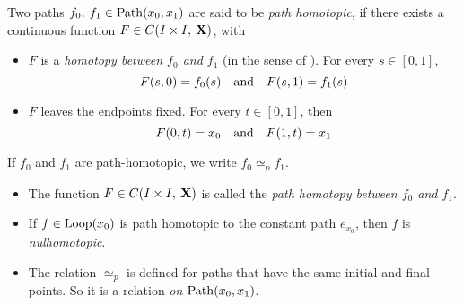 \documentclass[../main-manifolds.tex]{subfiles}
\providecommand{\phtp}{\simeq_p} %
\begin{document}
\begin{definition}\label{munkres:path-homotopy}
    Two paths $f_0,\: f_1\in\Path[x_0,x_1]$ are said to be \emph{path homotopic}, if there exists a continuous function $F\in C(I\times I,\: {\mathbf{X}})$, with
    \begin{itemize}
        \item $F$ is a \emph{homotopy between $f_0$ and $f_1$} (in the sense of ). For every $s\in [0,1]$,
        \begin{equation}\label{munkres:path-homotopy-deformation}
            F(s,0)=f_0(s)\qqtext{and}F(s,1)=f_1(s)
        \end{equation}
        \item $F$ leaves the endpoints fixed. For every $t\in[0,1]$, then
        \begin{equation}\label{munkres:path-homotopy-endpoints}
            F(0,t)=x_0\qqtext{and}F(1,t)=x_1
        \end{equation}
    \end{itemize}
    If $f_0$ and $f_1$ are path-homotopic, we write $f_0\phtp f_1$.\\

    \begin{itemize}
        \item The function $F\in C(I\times I,\: {\mathbf{X}})$ is called the \emph{path homotopy between $f_0$ and $f_1$}. 
        \item If $f\in\Loop[x_0]$ is path homotopic to the constant path $e_{x_0}$, then $f$ is \emph{nulhomotopic}.
        \item The relation $\phtp$ is defined for paths that have the same initial and final points. So it is a relation \emph{on} $\Path[x_0,x_1]$.
    \end{itemize}
\end{definition}
\end{document}
